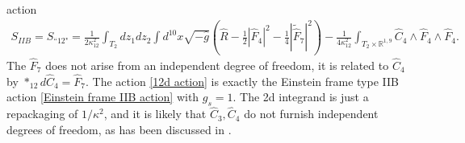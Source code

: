 action
\begin{equation}
\begin{aligned}
S_{IIB}=
S_{\text{``12"}}
= \frac{1}{2\kappa_{12}^2}\int_{T_2}dz_1 dz_2\int d^{10}x
\sqrt{-\hat{g}}
\left(
\hat{R} - \frac{1}{2}|\hat F_4|^2-\frac{1}{4}|\tilde{\hat{F}}_7|^2
\right)-\frac{1}{4\kappa_{12}^2}\int_{T_2\times \mathbb{R}^{1,9}}\hat{C}_4\wedge \hat{F}_4\wedge \hat{F}_4.
\end{aligned}
\label{12d action}
\end{equation}
The $\hat F_7$ does not arise from an independent degree of freedom, it is related to $\hat C_4$ by $*_{12}d\hat C_4 = \hat F_7$.
The action \eqref{12d action} is exactly the Einstein frame type IIB action \eqref{Einstein frame IIB action} with $g_s=1$.
The 2d integrand is just a repackaging of $1/\kappa^2$, and it is likely that $\hat C_3, \hat C_4$ do not furnish independent degrees of freedom, as has been discussed in \cite{Tseytlin:1996ne}.